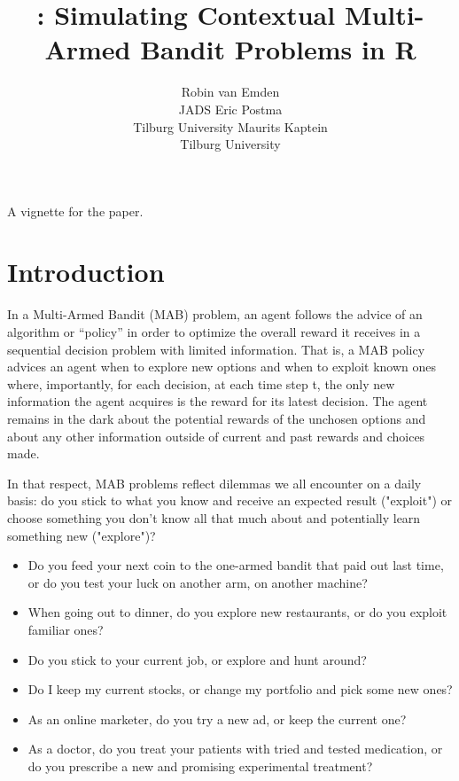 \documentclass[nojss]{jss}\usepackage[]{graphicx}\usepackage[]{color}
\author{Robin van Emden\\JADS \And
  Eric Postma\\Tilburg University \And
  Maurits Kaptein\\Tilburg University}
\title{\pkg{contextual}: Simulating Contextual Multi-Armed Bandit Problems in R}
\begin{document}
A vignette for the \cite{contextual} paper.








\section{Introduction}

In a Multi-Armed Bandit (MAB) problem, an agent follows the advice of an algorithm or \textquotedblleft{}policy\textquotedblright{} in order to optimize the overall reward it receives in a sequential decision problem with limited information. That is, a MAB policy advices an agent when to explore new options and when to exploit known ones \textendash{} where, importantly, for each decision, at each time step t, the only new information the agent acquires is the reward for its latest decision. The agent remains in the dark about the potential rewards of the unchosen options and about any other information outside of current and past rewards and choices made.

In that respect, MAB problems reflect dilemmas we all encounter on a daily basis: do you stick to what you know and receive an expected result ("exploit") or choose something you don't know all that much about and potentially learn something new ("explore")?

\begin{itemize}
\item Do you feed your next coin to the one-armed bandit that paid out last time, or do you test your luck on another arm, on another machine?
\item When going out to dinner, do you explore new restaurants, or do you exploit familiar ones?
\item Do you stick to your current job, or explore and hunt around?
\item Do I keep my current stocks, or change my portfolio and pick some new ones?
\item As an online marketer, do you try a new ad, or keep the current one?
\item As a doctor, do you treat your patients with tried and tested medication, or do you prescribe a new and promising experimental treatment?
\end{itemize}
\end{document}
